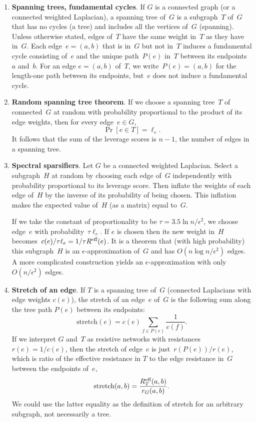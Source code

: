 \documentclass[11pt]{article}
\newcommand{\stretchh}{\mbox{stretch}}
\newcommand{\Reff}{R^{\mbox{\scriptsize eff}}}  %
\begin{document}
\begin{enumerate}
\item{\bf Spanning trees, fundamental cycles}.\label{stree}
If $G$ is a connected graph (or a connected weighted Laplacian),
a spanning tree of~$G$ is a subgraph~$T$ of~$G$ that has
no cycles (a tree) and includes all the vertices of~$G$ (spanning).
Unless otherwise stated, 
edges of~$T$ have the same weight in~$T$ as they have in~$G$.
Each edge~$e=(a,b)$ that is in~$G$ but not in~$T$ induces a
fundamental cycle consisting of~$e$ and the unique path~$P(e)$
in~$T$ between its endpoints~$a$ and~$b$.
For an edge $e=(a,b)$ of~$T$, we write~$P(e)=(a,b)$ 
for the length-one path between its endpoints, 
but~$e$ does not induce a fundamental cycle.

\item{\bf Random spanning tree theorem}.\label{rtree}
If we choose a spanning tree~$T$ of connected~$G$ at random 
with probability proportional to the product of its edge weights, 
then for every edge~$e\in G$,
$$\Pr[e\in T] = \ell_e.$$
It follows that the sum of the leverage scores is $n-1$,
the number of edges in a spanning tree.

\item{\bf Spectral sparsifiers}.
Let $G$ be a connected weighted Laplacian.
Select a subgraph~$H$ at random by choosing each edge
of~$G$ independently with probability proportional to its leverage score.
Then inflate the weights of each edge of~$H$ 
by the inverse of its probability of being chosen.
This inflation makes the expected value of~$H$ (as a matrix) equal to~$G$.

If we take the constant of proportionality to be $\tau=3.5\ln n/\epsilon^2$,
we choose edge~$e$ with probability~$\tau\ell_e$.
If $e$ is chosen then its new weight in~$H$ 
becomes~$c(e)/\tau\ell_e = 1/\tau\Reff(e)$.
It is a theorem that (with high probability) this subgraph~$H$ 
is an $\epsilon$-approximation of~$G$ and has $O(n\log n/\epsilon^2)$ edges.
A more complicated construction yields an $\epsilon$-approximation
with only $O(n/\epsilon^2)$ edges.

\item{\bf Stretch of an edge}.
If $T$ is a spanning tree of~$G$ 
(connected Laplacians with edge weights $c(e)$),
the stretch of an edge~$e$ of~$G$ is the following sum along the
tree path $P(e)$ between its endpoints:
$$\stretchh(e) = c(e)\sum_{f\in P(e)}\frac{1}{c(f)}.$$
If we interpret $G$ and~$T$ as resistive networks
with resistances $r(e) = 1/c(e)$, 
then the stretch of edge~$e$ is just~$r(P(e))/r(e)$,
which is ratio of the effective resistance in $T$ to the
edge resistance in~$G$ between the endpoints of~$e$,
$$\stretchh(a,b) = \frac{\Reff_T(a,b)}{r_G(a,b)}.$$
We could use the latter equality as the definition of stretch
for an arbitrary subgraph, not necessarily a tree.


\end{enumerate}
\end{document}

